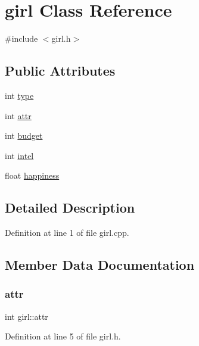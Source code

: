 \hypertarget{classgirl}{}\section{girl Class Reference}
\label{classgirl}


{\ttfamily \#include $<$girl.\+h$>$}

\subsection*{Public Attributes}
\begin{DoxyCompactItemize}
\item 
int \hyperlink{classgirl_a8e02617b5ea362f8c1311713de02f977}{type}
\item 
int \hyperlink{classgirl_a4251224ffb6c674917cd49b4b5ac5762}{attr}
\item 
int \hyperlink{classgirl_a3640dd73881e9ae2f6cbcf119d8c71e4}{budget}
\item 
int \hyperlink{classgirl_a909600ba1a2bd73d658c59421e6634f8}{intel}
\item 
float \hyperlink{classgirl_a29904a0d088ca25b70303936110b19cd}{happiness}
\end{DoxyCompactItemize}


\subsection{Detailed Description}


Definition at line 1 of file girl.\+cpp.



\subsection{Member Data Documentation}
\mbox{\label{classgirl_a4251224ffb6c674917cd49b4b5ac5762}} 
\subsubsection{\texorpdfstring{attr}{attr}}
{\footnotesize\ttfamily int girl\+::attr}



Definition at line 5 of file girl.\+h.

\mbox{\label{classgirl_a3640dd73881e9ae2f6cbcf119d8c71e4}} 
